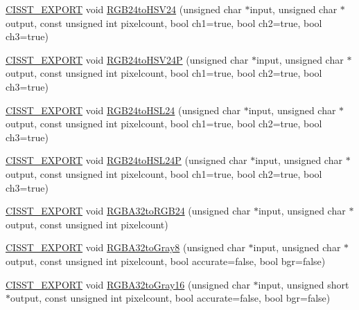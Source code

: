 \begin{DoxyCompactItemize}
\item 
\hyperlink{cmn_export_macros_8h_a99393e0c3ac434b2605235bbe20684f8}{C\+I\+S\+S\+T\+\_\+\+E\+X\+P\+O\+R\+T} void \hyperlink{namespacesvl_converter_a8438f6d1c5c4f952bcb74ca713cc3e92}{R\+G\+B24to\+H\+S\+V24} (unsigned char $\ast$input, unsigned char $\ast$output, const unsigned int pixelcount, bool ch1=true, bool ch2=true, bool ch3=true)
\item 
\hyperlink{cmn_export_macros_8h_a99393e0c3ac434b2605235bbe20684f8}{C\+I\+S\+S\+T\+\_\+\+E\+X\+P\+O\+R\+T} void \hyperlink{namespacesvl_converter_ac698913e63b8eb4e52ee68c04136d371}{R\+G\+B24to\+H\+S\+V24\+P} (unsigned char $\ast$input, unsigned char $\ast$output, const unsigned int pixelcount, bool ch1=true, bool ch2=true, bool ch3=true)
\item 
\hyperlink{cmn_export_macros_8h_a99393e0c3ac434b2605235bbe20684f8}{C\+I\+S\+S\+T\+\_\+\+E\+X\+P\+O\+R\+T} void \hyperlink{namespacesvl_converter_ad4b71b99c952b6cf243780117d0b0b7b}{R\+G\+B24to\+H\+S\+L24} (unsigned char $\ast$input, unsigned char $\ast$output, const unsigned int pixelcount, bool ch1=true, bool ch2=true, bool ch3=true)
\item 
\hyperlink{cmn_export_macros_8h_a99393e0c3ac434b2605235bbe20684f8}{C\+I\+S\+S\+T\+\_\+\+E\+X\+P\+O\+R\+T} void \hyperlink{namespacesvl_converter_a9636254f31fb58640d0dbb23f68851c6}{R\+G\+B24to\+H\+S\+L24\+P} (unsigned char $\ast$input, unsigned char $\ast$output, const unsigned int pixelcount, bool ch1=true, bool ch2=true, bool ch3=true)
\item 
\hyperlink{cmn_export_macros_8h_a99393e0c3ac434b2605235bbe20684f8}{C\+I\+S\+S\+T\+\_\+\+E\+X\+P\+O\+R\+T} void \hyperlink{namespacesvl_converter_a7b53edede43334f9f9af1a332b5546ca}{R\+G\+B\+A32to\+R\+G\+B24} (unsigned char $\ast$input, unsigned char $\ast$output, const unsigned int pixelcount)
\item 
\hyperlink{cmn_export_macros_8h_a99393e0c3ac434b2605235bbe20684f8}{C\+I\+S\+S\+T\+\_\+\+E\+X\+P\+O\+R\+T} void \hyperlink{namespacesvl_converter_a65628ee6d10da68b6ad3133e3fb19ee6}{R\+G\+B\+A32to\+Gray8} (unsigned char $\ast$input, unsigned char $\ast$output, const unsigned int pixelcount, bool accurate=false, bool bgr=false)
\item 
\hyperlink{cmn_export_macros_8h_a99393e0c3ac434b2605235bbe20684f8}{C\+I\+S\+S\+T\+\_\+\+E\+X\+P\+O\+R\+T} void \hyperlink{namespacesvl_converter_a8dd1e673db19a4027e3f7112ffc59928}{R\+G\+B\+A32to\+Gray16} (unsigned char $\ast$input, unsigned short $\ast$output, const unsigned int pixelcount, bool accurate=false, bool bgr=false)

\end{DoxyCompactItemize}
